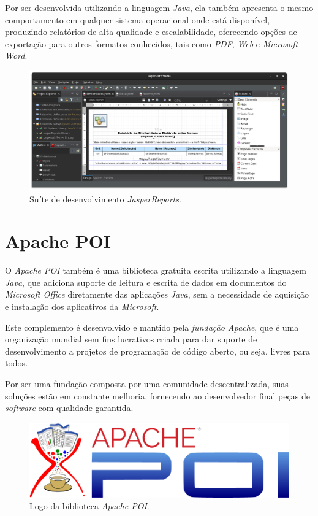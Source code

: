 \documentclass[
	12pt,			%
	openright,		%
	oneside,	
	a4paper,		%
	english,		%
	brazil			%
]{abntex2/abntex2}  %
\begin{document}
	Por ser desenvolvida utilizando a linguagem \textit{Java}, ela também apresenta o mesmo comportamento em qualquer sistema operacional onde está disponível, produzindo relatórios de alta qualidade e escalabilidade, oferecendo opções de exportação para outros formatos conhecidos, tais como \textit{PDF}, \textit{Web} e \textit{Microsoft Word}.
	
	\begin{figure}[H]
		\caption{\label{jasper-reports}Suíte de desenvolvimento \textit{JasperReports\textregistered}.}
		\begin{center}
			\includegraphics[scale=0.35]{img/jaspersoft}
		\end{center}
	\end{figure}

	\section{Apache POI}
	
	O \textit{Apache POI} \cite{poi} também é uma biblioteca gratuita escrita utilizando a linguagem \textit{Java}, que adiciona suporte de leitura e escrita de dados em documentos do \textit{Microsoft Office} diretamente das aplicações \textit{Java}, sem a necessidade de aquisição e instalação dos aplicativos da \textit{Microsoft}.
	
	Este complemento é desenvolvido e mantido pela \textit{fundação Apache}, que é uma organização mundial sem fins lucrativos criada para dar suporte de desenvolvimento a projetos de programação de código aberto, ou seja, livres para todos.
	
	Por ser uma fundação composta por uma comunidade descentralizada, suas soluções estão em constante melhoria, fornecendo ao desenvolvedor final peças de \textit{software} com qualidade garantida.

	\begin{figure}[H]
		\caption{\label{apache-poi}Logo da biblioteca \textit{Apache POI}.}
		\begin{center}
			\includegraphics[scale=0.35]{img/apache-poi}
		\end{center}
	\end{figure}
\end{document}

